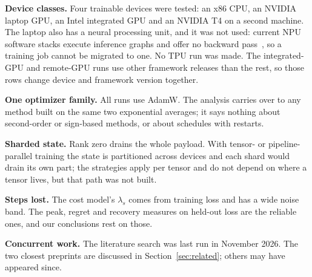 \textbf{Device classes.} Four trainable devices were tested: an x86 CPU, an NVIDIA laptop GPU, an Intel integrated GPU
and an NVIDIA T4 on a second machine.
The laptop also has a neural processing unit, and it was not used: current NPU software stacks execute inference
graphs and offer no backward pass~\cite{openvino2025npu,feng2024steppingforward}, so a training job cannot be migrated
to one. No TPU run was made. The integrated-GPU and remote-GPU runs use other framework releases than the
rest, so those rows change device and framework version together.

\textbf{One optimizer family.} All runs use AdamW. The analysis carries over to any method built on the same two
exponential averages; it says nothing about second-order or sign-based methods, or about schedules with restarts.

\textbf{Sharded state.} Rank zero drains the whole payload. With tensor- or pipeline-parallel training the state is
partitioned across devices and each shard would drain its own part; the strategies apply per tensor and do not depend
on where a tensor lives, but that path was not built.

\textbf{Steps lost.} The cost model's $\lambda_s$ comes from training loss and has a wide noise band. The peak, regret
and recovery measures on held-out loss are the reliable ones, and our conclusions rest on those.

\textbf{Concurrent work.} The literature search was last run in November 2026. The two closest preprints are discussed
in Section~\ref{sec:related}; others may have appeared since.
